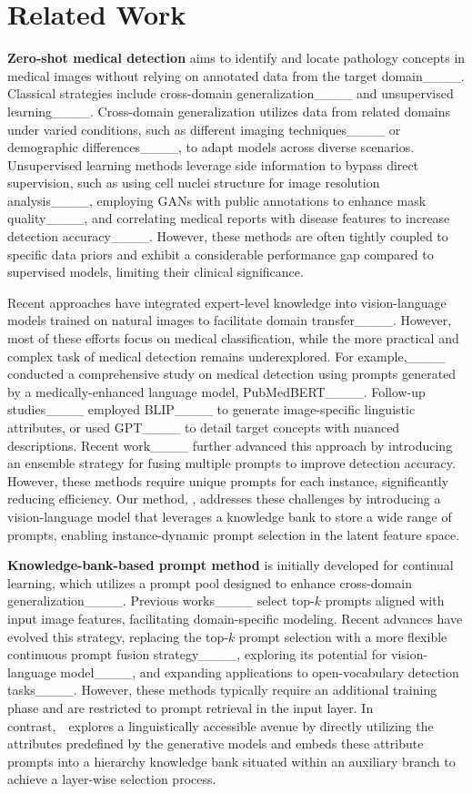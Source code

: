 \section{Related Work}
\textbf{Zero-shot medical detection} aims to identify and locate pathology concepts in medical images without relying on annotated data from the target domain____. Classical strategies include cross-domain generalization____ and unsupervised learning____. Cross-domain generalization utilizes data from related domains under varied conditions, such as different imaging techniques____ or demographic differences____, to adapt models across diverse scenarios. Unsupervised learning methods leverage side information to bypass direct supervision, such as using cell nuclei structure for image resolution analysis____, employing GANs with public annotations to enhance mask quality____, and correlating medical reports with disease features to increase detection accuracy____. However, these methods are often tightly coupled to specific data priors and exhibit a considerable performance gap compared to supervised models, limiting their clinical significance.

Recent approaches have integrated expert-level knowledge into vision-language models trained on natural images to facilitate domain transfer____. However, most of these efforts focus on medical classification, while the more practical and complex task of medical detection remains underexplored. For example,____ conducted a comprehensive study on medical detection using prompts generated by a medically-enhanced language model, PubMedBERT____. Follow-up studies____ employed BLIP____ to generate image-specific linguistic attributes, or used GPT____ to detail target concepts with nuanced descriptions. Recent work____ further advanced this approach by introducing an ensemble strategy for fusing multiple prompts to improve detection accuracy. However, these methods require unique prompts for each instance, significantly reducing efficiency. Our method, \ours, addresses these challenges by introducing a vision-language model that leverages a knowledge bank to store a wide range of prompts, enabling instance-dynamic prompt selection in the latent feature space.




\textbf{Knowledge-bank-based prompt method} is initially developed for continual learning, which utilizes a prompt pool designed to enhance cross-domain generalization____. 
Previous works____ select top-$k$ prompts aligned with input image features, facilitating domain-specific modeling.
Recent advances have evolved this strategy, replacing the top-$k$ prompt selection
with a more flexible continuous prompt fusion strategy____, exploring its potential for vision-language model____, and expanding applications to open-vocabulary detection tasks____.
{However, these methods typically require an additional training phase and are restricted to prompt retrieval in the input layer. In contrast,~\ours~explores a linguistically accessible avenue by directly utilizing the attributes predefined by the generative models and embeds these attribute prompts into a hierarchy knowledge bank situated within an auxiliary branch to achieve a layer-wise selection process.
}